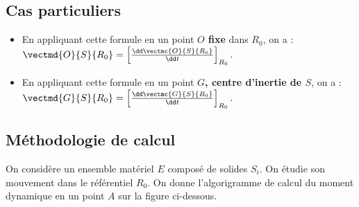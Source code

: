 \subsection{Cas particuliers}

\begin{itemize}
\item En appliquant cette formule en un point \textbf{$O$ fixe} dans $R_0$, on a :
$\vectmd{O}{S}{R_0}=\left[\frac{\dd \vectmc{O}{S}{R_0}}{\dd t}\right]_{R_0}.$
\item En appliquant cette formule en un point \textbf{$G$, centre d'inertie de $S$}, on a :
$\vectmd{G}{S}{R_0}=\left[\frac{\dd \vectmc{G}{S}{R_0}}{\dd t}\right]_{R_0}.$
\end{itemize}





\newpage
\subsection{Méthodologie de calcul}

On considère un ensemble matériel $E$ composé de solides $S_i$. On étudie son mouvement dans le référentiel $R_0$.
On donne l'algorigramme de calcul du moment dynamique en un point $A$ sur la figure ci-dessous.%

